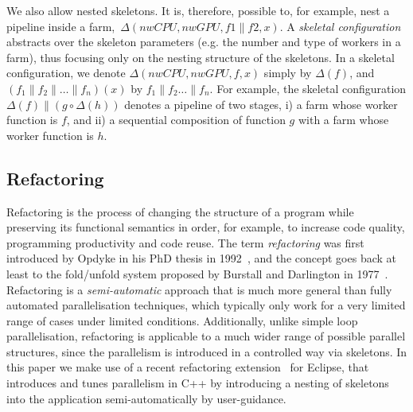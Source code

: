 \documentclass[smallextended]{svjour3}
\begin{document}
\noindent
We also allow nested skeletons. It is, therefore, possible to, for example, nest a
pipeline inside a farm,\ $\Delta(nwCPU,nwGPU,f1 \parallel f2, x)$.
A \emph{skeletal configuration}  abstracts over the skeleton
parameters (e.g. the number and type of
workers in a farm), thus focusing only on the nesting structure of the
skeletons. In a skeletal configuration, we denote
$\Delta(\mathit{nwCPU},\mathit{nwGPU},f,x)$ simply by $\Delta(f)$, and $(f_1 \parallel
f_2 \parallel \dots \parallel f_n)(x)$ by $f_1 \parallel f_2
\dots \parallel f_n$. For example, the skeletal
configuration $\Delta(f) \parallel (g \circ \Delta(h))$
denotes a
pipeline of two stages, %
i) a farm whose worker function is $f$, and ii) a sequential composition of
function $g$ with a farm whose worker function is $h$. %
%

\subsection{Refactoring}
Refactoring is the process of changing the structure of a program
while preserving its functional semantics in order, for example, 
to increase code quality, programming productivity and code reuse.
The term \emph{refactoring} was first introduced by Opdyke in his PhD
thesis in 1992~\cite{opdyke}, and the concept goes back at least to the fold/unfold system proposed
by Burstall and Darlington in 1977~\cite{darlington77}.
Refactoring is a \emph{semi-automatic} approach that is much more
general than fully automated parallelisation techniques, which typically
only work for a very limited range of cases under limited conditions.
Additionally, unlike simple loop parallelisation, refactoring is applicable
to a much wider range of possible parallel structures, since the parallelism is introduced
in a controlled way via skeletons.
In this paper we make use of a recent refactoring extension~\cite{pdp} for Eclipse, that introduces and tunes parallelism in C++ by introducing a nesting of skeletons into the application semi-automatically by user-guidance.
\end{document}
